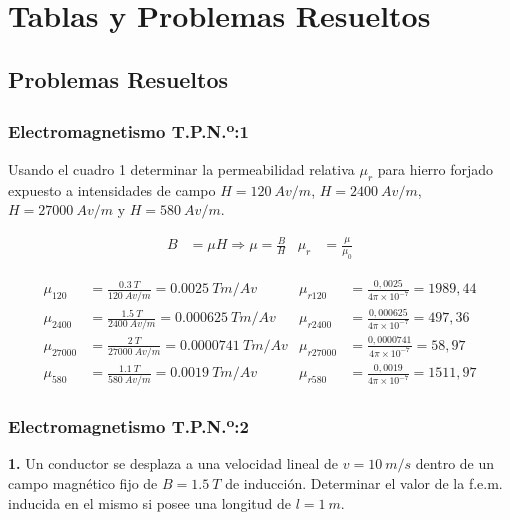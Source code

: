 \documentclass[../main]{subfiles}
\begin{document}
\chapter{Tablas y Problemas Resueltos}
\section{Problemas Resueltos}

\subsection{Electromagnetismo T.P.N.\textsuperscript{o}:1}

Usando el cuadro 1 determinar la permeabilidad relativa $\mu_r$ para hierro forjado expuesto a intensidades de campo $H = \qty{120}{Av/m}$, $H = \qty{2400}{Av/m}$, $H = \qty{27000}{Av/m}$ y $H = \qty{580}{Av/m}$.

\begin{align*}
B &= \mu H \Rightarrow \mu = \frac{B}{H} & \mu_r &= \frac{\mu}{\mu_0}
\end{align*}

\begin{align*}
\mu_{120} &= \frac{\qty{0,3}{T}}{\qty{120}{Av/m}} = \boxed{\qty{0,0025}{Tm/Av}} & \mu_{r120} &= \frac{0,0025}{4\pi \times 10^{-7}} = \boxed{1989,44} \\
\mu_{2400} &= \frac{\qty{1,5}{T}}{\qty{2400}{Av/m}} = \boxed{\qty{0,000625}{Tm/Av}} & \mu_{r2400} &= \frac{0,000625}{4\pi \times 10^{-7}} = \boxed{497,36} \\
\mu_{27000} &= \frac{\qty{2}{T}}{\qty{27000}{Av/m}} = \boxed{\qty{0,0000741}{Tm/Av}} & \mu_{r27000} &= \frac{0,0000741}{4\pi \times 10^{-7}} = \boxed{58,97} \\
\mu_{580} &= \frac{\qty{1,1}{T}}{\qty{580}{Av/m}} = \boxed{\qty{0,0019}{Tm/Av}} & \mu_{r580} &= \frac{0,0019}{4\pi \times 10^{-7}} = \boxed{1511,97}
\end{align*}

\subsection{Electromagnetismo T.P.N.\textsuperscript{o}:2}

\noindent\textbf{1.} Un conductor se desplaza a una velocidad lineal de $v = \qty{10}{m/s}$ dentro de un campo magnético fijo de $B = \qty{1,5}{T}$ de inducción. Determinar el valor de la f.e.m. inducida en el mismo si posee una longitud de $l = \qty{1}{m}$.
\end{document}
